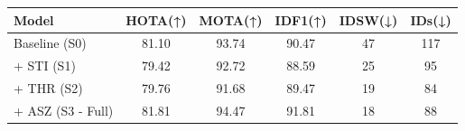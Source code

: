 \begin{tabular}{lccccc}
\toprule
Model & HOTA(↑) & MOTA(↑) & IDF1(↑) & IDSW(↓) & IDs(↓) \\
\midrule
Baseline (S0) & 81.10 & 93.74 & 90.47 & 47 & 117 \\
+ STI (S1) & 79.42 & 92.72 & 88.59 & 25 & 95 \\
+ THR (S2) & 79.76 & 91.68 & 89.47 & 19 & 84 \\
+ ASZ (S3 - Full) & 81.81 & 94.47 & 91.81 & 18 & 88 \\
\bottomrule
\end{tabular}
